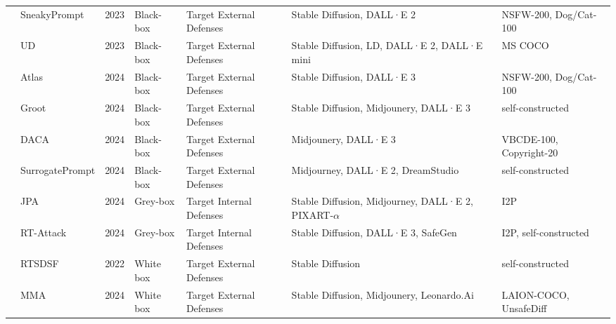 \begin{table*}[htp]
{\begin{tabular}{p{}p{}p{}p{}p{}p{}p{}}
\cellcolor{white} & SneakyPrompt\cite{yang2024sneakyprompt} & 2023 & Black-box & Target External Defenses & Stable Diffusion, DALL·E 2 & NSFW-200, Dog/Cat-100 \\
\cellcolor{white} & UD\cite{qu2023unsafe} & 2023 & Black-box & Target External Defenses & Stable Diffusion, LD, DALL·E 2, DALL·E mini & MS COCO \\
\cellcolor{white} & {Atlas}\cite{dong2024jailbreaking} & 2024 & Black-box & Target External Defenses & Stable Diffusion, DALL·E 3 & NSFW-200, Dog/Cat-100 \\ 
\cellcolor{white} & {Groot}\cite{liu2024groot} & 2024 & Black-box & Target External Defenses & Stable Diffusion, Midjounery, DALL·E 3 & self-constructed \\ 
\cellcolor{white} & {DACA}\cite{deng2023divide} & 2024 & Black-box & Target External Defenses & Midjounery, DALL·E 3 & VBCDE-100, Copyright-20 \\ 
\cellcolor{white} & {SurrogatePrompt}\cite{ba2023surrogateprompt} & 2024 & Black-box & Target External Defenses & Midjourney, DALL·E 2, DreamStudio & self-constructed \\
\cellcolor{white} & {JPA}\cite{ma2024jailbreaking} & 2024 & Grey-box & Target Internal Defenses & Stable Diffusion, Midjourney, DALL·E 2, PIXART-$\alpha$ & I2P \\
\cellcolor{white} & {RT-Attack}\cite{gao2024rt} & 2024 & Grey-box & Target Internal Defenses & Stable Diffusion, DALL·E 3, SafeGen & I2P, self-constructed \\
\cellcolor{white} & RTSDSF\cite{rando2022red} & 2022 & White box & Target External Defenses & Stable Diffusion & self-constructed \\ 
\cellcolor{white} & {MMA}\cite{yang2024mma} & 2024 & White box & Target External Defenses & Stable Diffusion, Midjounery, Leonardo.Ai & LAION-COCO, UnsafeDiff \\

\end{tabular}}
\end{table*}
